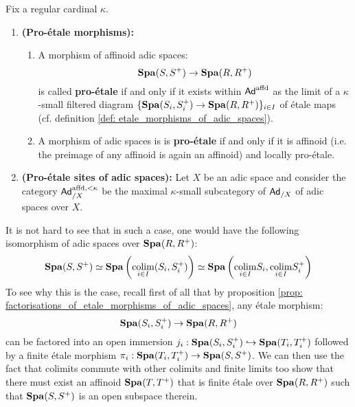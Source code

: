                 \begin{definition} \label{def: pro_etale_topology_on_adic_spaces}
                    Fix a regular cardinal $\kappa$.
                        \begin{enumerate}
                            \item \textbf{(Pro-\'etale morphisms):} 
                                \begin{enumerate}
                                    \item A morphism of affinoid adic spaces:
                                        $$\mathbf{Spa}(S, S^+) \to \mathbf{Spa}(R, R^+)$$
                                    is called \textbf{pro-\'etale} if and only if it exists within $\mathsf{Ad}^{\mathrm{affd}}$ as the limit of a $\kappa$-small filtered diagram $\{\mathbf{Spa}(S_i, S_i^+) \to \mathbf{Spa}(R, R^+)\}_{i \in I}$ of \'etale maps (cf. definition \ref{def: etale_morphisms_of_adic_spaces}). 
                                    \item A morphism of adic spaces is is \textbf{pro-\'etale} if and only if it is affinoid (i.e. the preimage of any affinoid is again an affinoid) and locally pro-\'etale.
                                \end{enumerate}
                            \item \textbf{(Pro-\'etale sites of adic spaces):} Let $X$ be an adic space and consider the category $\mathsf{Ad}^{\mathrm{affd}, < \kappa}_{/X}$ be the maximal $\kappa$-small subcategory of $\mathsf{Ad}_{/X}$ of adic spaces over $X$.
                        \end{enumerate}
                \end{definition}
                \begin{remark}
                    It is not hard to see that in such a case, one would have the following isomorphism of adic spaces over $\mathbf{Spa}(R, R^+)$:
                        $$\mathbf{Spa}(S, S^+) \simeq \mathbf{Spa}\left( \underset{i \in I}{\operatorname{colim}} (S_i, S_i^+) \right) \simeq \mathbf{Spa} \left(\underset{i \in I}{\operatorname{colim}} S_i, \underset{i \in I}{\operatorname{colim}} S_i^+\right)$$
                    To see why this is the case, recall first of all that by proposition \ref{prop: factorisations_of_etale_morphisms_of_adic_spaces}, any \'etale morphism:
                        $$\mathbf{Spa}(S_i, S_i^+) \to \mathbf{Spa}(R, R^+)$$
                    can be factored into an open immersion $j_i: \mathbf{Spa}(S_i, S_i^+) \hookrightarrow \mathbf{Spa}(T_i, T_i^+)$ followed by a finite \'etale morphism $\pi_i: \mathbf{Spa}(T_i, T_i^+) \to \mathbf{Spa}(S, S^+)$. We can then use the fact that colimits commute with other colimits and finite limits too show that there must exist an affinoid $\mathbf{Spa}(T, T^+)$ that is finite \'etale over $\mathbf{Spa}(R, R^+)$ such that $\mathbf{Spa}(S, S^+)$ is an open subspace therein.
                \end{remark}
                
